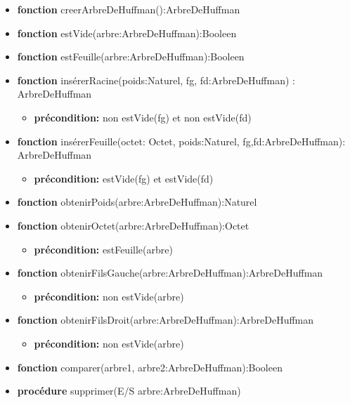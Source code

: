 	\begin{itemize}[label=$\ $, leftmargin=1cm]
		 \item \textbf{fonction} creerArbreDeHuffman():ArbreDeHuffman
		 \item \textbf{fonction} estVide(arbre:ArbreDeHuffman):Booleen
		 \item \textbf{fonction} estFeuille(arbre:ArbreDeHuffman):Booleen
		 \item \textbf{fonction} insérerRacine(poids:Naturel, fg, fd:ArbreDeHuffman) : ArbreDeHuffman
		 \begin{itemize}[label=$| $]
            \item \textbf{précondition:} non estVide(fg) et non estVide(fd)
         \end{itemize}
         \item \textbf{fonction} insérerFeuille(octet: Octet, poids:Naturel, fg,fd:ArbreDeHuffman): ArbreDeHuffman
         \begin{itemize}[label=$| $]
            \item \textbf{précondition:} estVide(fg) et estVide(fd)
         \end{itemize}
         \item \textbf{fonction} obtenirPoids(arbre:ArbreDeHuffman):Naturel
         \item \textbf{fonction} obtenirOctet(arbre:ArbreDeHuffman):Octet
         \begin{itemize}[label=$| $]
            \item \textbf{précondition:} estFeuille(arbre)
         \end{itemize}
         \item \textbf{fonction} obtenirFilsGauche(arbre:ArbreDeHuffman):ArbreDeHuffman
         \begin{itemize}[label=$| $]
            \item \textbf{précondition:} non estVide(arbre)
         \end{itemize}
         \item \textbf{fonction} obtenirFilsDroit(arbre:ArbreDeHuffman):ArbreDeHuffman
         \begin{itemize}[label=$| $]
            \item \textbf{précondition:} non estVide(arbre)
         \end{itemize}
         \item \textbf{fonction} comparer(arbre1, arbre2:ArbreDeHuffman):Booleen
         \item \textbf{procédure} supprimer(E/S arbre:ArbreDeHuffman)

	\end{itemize} 

